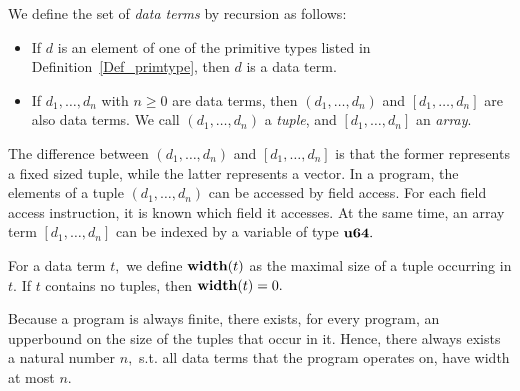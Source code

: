 \begin{definition}
   \label{Def_data_term}
   We define the set of \emph{data terms} 
   by recursion as follows:
   \begin{itemize}
   \item
      If $ d $ is an element of one of the primitive types
      listed in Definition~\ref{Def_primtype},
      then $ d $ is a data term.
   \item
      If $ d_1, \ldots, d_n $ with $ n \geq 0 $ are
      data terms, then
      $ ( d_1, \ldots, d_n ) $
      and
      $ [ d_1, \ldots, d_n ] $ are also data terms. 
      We call $ ( d_1, \ldots, d_n ) $ a \emph{tuple}, and
      $ [ d_1, \ldots, d_n ] $ an \emph{array}.
   \end{itemize}
\end{definition}
The difference between $ (d_1, \ldots, d_n) $ and
$ [ d_1, \ldots, d_n ] $ is that the former represents
a fixed sized tuple, while the latter represents a vector.
In a program, the elements of a tuple $ (d_1, \ldots, d_n) $ can be
accessed by field access. For each field access instruction,
it is known which field it accesses.
At the same time, an array term $ [ d_1, \ldots, d_n ] $ can be indexed
by a variable of type $ {\bf u64}. $ 
\begin{definition}
   \label{Def_width}
   For a data term $ t, $ we define $ {\bf width}(t) $
   as the maximal size of a tuple occurring in $ t. $
   If $ t $ contains no tuples, then $ {\bf width}(t) = 0. $
\end{definition}
Because a program is always finite, 
there exists, for every program, an upperbound on the size
of the tuples that occur in it.
Hence, there always exists a natural number $ n, $ s.t.
all data terms that the program operates on, have
width at most $ n. $

